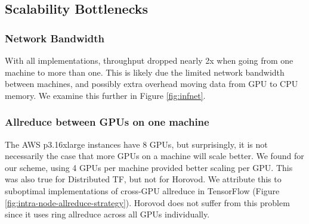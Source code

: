 \subsection{Scalability Bottlenecks}
\subsubsection{Network Bandwidth}
With all implementations, throughput dropped nearly 2x when going from one machine to more than one. This is likely due the limited network bandwidth between machines, and possibly extra overhead moving data from GPU to CPU memory. We examine this further in Figure \ref{fig:infnet}.

\subsubsection{Allreduce between GPUs on one machine}
The AWS p3.16xlarge instances have 8 GPUs, but surprisingly, it is not necessarily the case that more GPUs on a machine will scale better.
We found for our scheme, using 4 GPUs per machine provided better scaling per GPU.
This was also true for Distributed TF, but not for Horovod.
We attribute this to suboptimal implementations of cross-GPU allreduce in TensorFlow (Figure \ref{fig:intra-node-allreduce-strategy}). Horovod does not suffer from this problem since it uses ring allreduce across all GPUs individually.
